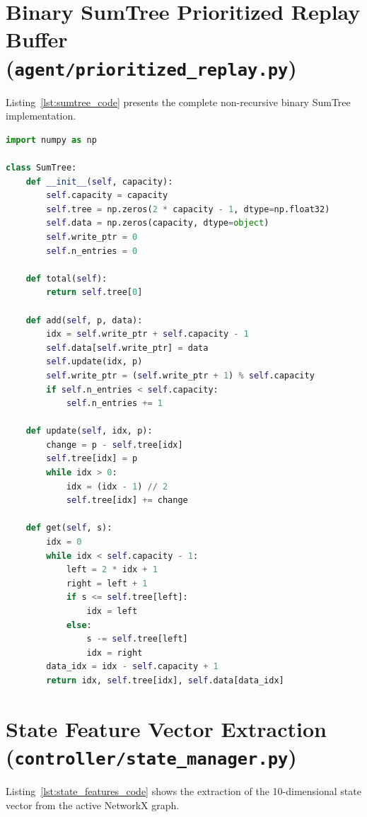 \section{Binary SumTree Prioritized Replay Buffer (\texttt{agent/prioritized\_replay.py})}
Listing~\ref{lst:sumtree_code} presents the complete non-recursive binary SumTree implementation.

\begin{lstlisting}[language=Python, caption={Iterative Binary SumTree and Prioritized Experience Replay}, label={lst:sumtree_code}]
import numpy as np

class SumTree:
    def __init__(self, capacity):
        self.capacity = capacity
        self.tree = np.zeros(2 * capacity - 1, dtype=np.float32)
        self.data = np.zeros(capacity, dtype=object)
        self.write_ptr = 0
        self.n_entries = 0

    def total(self):
        return self.tree[0]

    def add(self, p, data):
        idx = self.write_ptr + self.capacity - 1
        self.data[self.write_ptr] = data
        self.update(idx, p)
        self.write_ptr = (self.write_ptr + 1) % self.capacity
        if self.n_entries < self.capacity:
            self.n_entries += 1

    def update(self, idx, p):
        change = p - self.tree[idx]
        self.tree[idx] = p
        while idx > 0:
            idx = (idx - 1) // 2
            self.tree[idx] += change

    def get(self, s):
        idx = 0
        while idx < self.capacity - 1:
            left = 2 * idx + 1
            right = left + 1
            if s <= self.tree[left]:
                idx = left
            else:
                s -= self.tree[left]
                idx = right
        data_idx = idx - self.capacity + 1
        return idx, self.tree[idx], self.data[data_idx]
\end{lstlisting}

\section{State Feature Vector Extraction (\texttt{controller/state\_manager.py})}
Listing~\ref{lst:state_features_code} shows the extraction of the 10-dimensional state vector from the active NetworkX graph.


